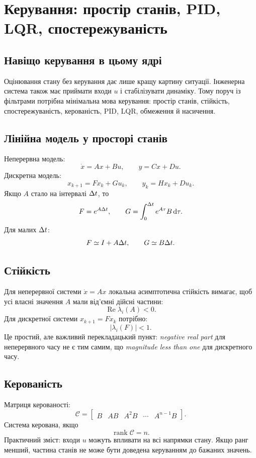 
\chapter{Керування: простір станів, PID, LQR, спостережуваність}

\section{Навіщо керування в цьому ядрі}

Оцінювання стану без керування дає лише кращу картину ситуації. Інженерна система також має приймати входи $u$ і стабілізувати динаміку. Тому поруч із фільтрами потрібна мінімальна мова керування: простір станів, стійкість, спостережуваність, керованість, PID, LQR, обмеження й насичення.

\section{Лінійна модель у просторі станів}

Неперервна модель:
\[
\dot x = Ax+Bu,\qquad y=Cx+Du.
\]
Дискретна модель:
\[
x_{k+1}=F x_k+G u_k,\qquad y_k=H x_k+D u_k.
\]
Якщо $A$ стало на інтервалі $\Delta t$, то
\[
F=e^{A\Delta t},\qquad
G=\int_0^{\Delta t}e^{A\tau}B\,\mathrm{d}\tau.
\]
Для малих $\Delta t$:
\[
F\simeq I+A\Delta t,\qquad G\simeq B\Delta t.
\]

\section{Стійкість}

Для неперервної системи $\dot x=Ax$ локальна асимптотична стійкість вимагає, щоб усі власні значення $A$ мали від'ємні дійсні частини:
\[
\operatorname{Re}\lambda_i(A)<0.
\]
Для дискретної системи $x_{k+1}=Fx_k$ потрібно:
\[
|\lambda_i(F)|<1.
\]
Це простий, але важливий перекладацький пункт: \emph{negative real part} для неперервного часу не є тим самим, що \emph{magnitude less than one} для дискретного часу.

\section{Керованість}

Матриця керованості:
\[
\mathcal C =
\begin{bmatrix}
B & AB & A^2B & \cdots & A^{n-1}B
\end{bmatrix}.
\]
Система керована, якщо
\[
\operatorname{rank}\mathcal C=n.
\]
Практичний зміст: входи $u$ можуть впливати на всі напрямки стану. Якщо ранг менший, частина станів не може бути доведена керуванням до бажаних значень.

